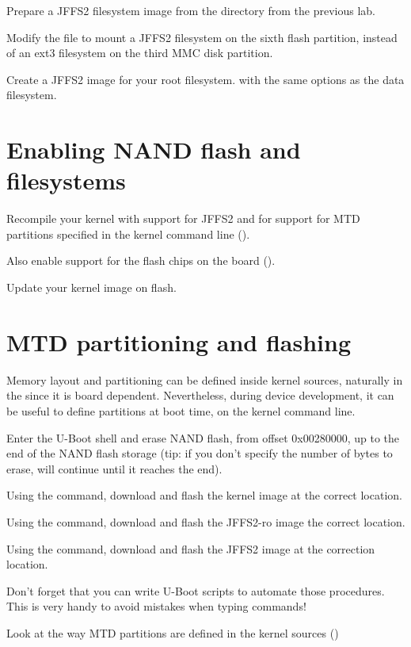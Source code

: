 Prepare a JFFS2 filesystem image from the 
directory from the previous lab.

Modify the  file to mount a JFFS2 filesystem on
the sixth flash partition, instead of an ext3 filesystem on the third
MMC disk partition.

Create a JFFS2 image for your root filesystem. with the same options
as the data filesystem.

\section{Enabling NAND flash and filesystems}

Recompile your kernel with support for JFFS2 and for support for MTD
partitions specified in the kernel command line
().

Also enable support for the flash chips on the board
().

Update your kernel image on flash.

\section{MTD partitioning and flashing}

Memory layout and partitioning can be defined inside kernel sources,
naturally in the  since it is
board dependent. Nevertheless, during device development, it can be
useful to define partitions at boot time, on the kernel command line.

Enter the U-Boot shell and erase NAND flash, from offset
0x00280000, up to the end of the NAND flash storage (tip: if you don't
specify the number of bytes to erase,  will
continue until it reaches the end).

Using the  command, download and flash the kernel image at
the correct location.

Using the  command, download and flash the JFFS2-ro image
the correct location.

Using the  command, download and flash the JFFS2 image at
the correction location.

Don't forget that you can write U-Boot scripts to automate those
procedures. This is very handy to avoid mistakes when typing commands!

Look at the way MTD partitions are defined in the kernel sources
()

